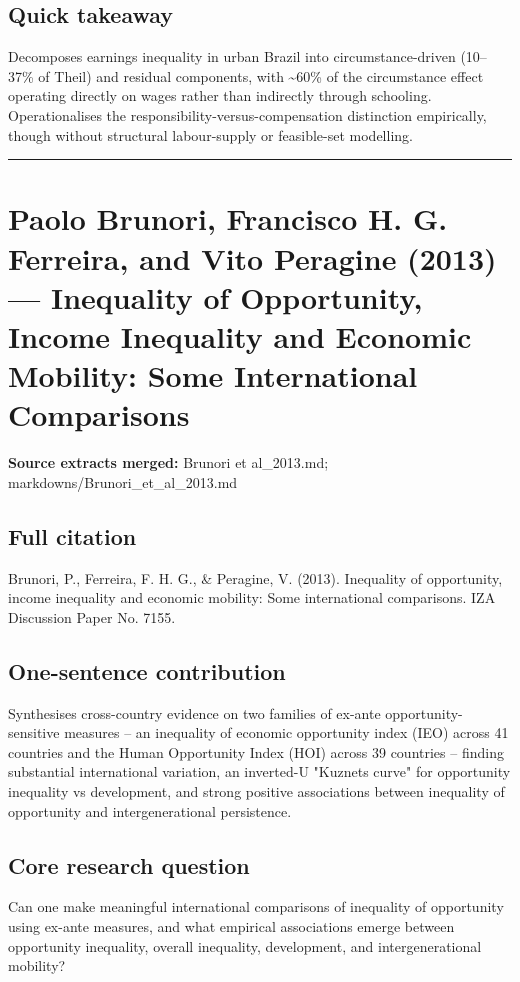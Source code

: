 \documentclass[11pt,a4paper]{article}
\begin{document}
\subsection*{Quick takeaway}
Decomposes earnings inequality in urban Brazil into circumstance-driven (10--37\% of Theil) and residual components, with \textasciitilde{}60\% of the circumstance effect operating directly on wages rather than indirectly through schooling. Operationalises the responsibility-versus-compensation distinction empirically, though without structural labour-supply or feasible-set modelling.

\medskip\hrule\medskip

\section*{Paolo Brunori, Francisco H. G. Ferreira, and Vito Peragine (2013) — Inequality of Opportunity, Income Inequality and Economic Mobility: Some International Comparisons}

\textbf{Source extracts merged:} Brunori et al\_2013.md; markdowns/Brunori\_et\_al\_2013.md

\subsection*{Full citation}
Brunori, P., Ferreira, F. H. G., \& Peragine, V. (2013). Inequality of opportunity, income inequality and economic mobility: Some international comparisons. IZA Discussion Paper No. 7155.

\subsection*{One-sentence contribution}
Synthesises cross-country evidence on two families of ex-ante opportunity-sensitive measures -- an inequality of economic opportunity index (IEO) across 41 countries and the Human Opportunity Index (HOI) across 39 countries -- finding substantial international variation, an inverted-U "Kuznets curve" for opportunity inequality vs development, and strong positive associations between inequality of opportunity and intergenerational persistence.

\subsection*{Core research question}
Can one make meaningful international comparisons of inequality of opportunity using ex-ante measures, and what empirical associations emerge between opportunity inequality, overall inequality, development, and intergenerational mobility?
\end{document}
